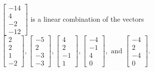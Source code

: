 \begin{exercise}
\begin{exerciseStatement}
  \end{exerciseStatement}
  \begin{exerciseAnswer}
   \(\left[\begin{array}{c}
-14 \\
4 \\
-2 \\
-12
\end{array}\right]\) 
  	 is  
	a linear combination of the vectors \(\left[\begin{array}{c}
2 \\
2 \\
1 \\
-2
\end{array}\right] , \left[\begin{array}{c}
-5 \\
2 \\
-3 \\
-3
\end{array}\right] , \left[\begin{array}{c}
4 \\
2 \\
-1 \\
1
\end{array}\right] , \left[\begin{array}{c}
-4 \\
-1 \\
4 \\
0
\end{array}\right] , \text{ and } \left[\begin{array}{c}
-4 \\
2 \\
-4 \\
0
\end{array}\right]\).

	
  


  \end{exerciseAnswer}
\end{exercise}